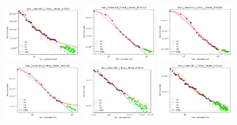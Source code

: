 \documentclass{article} %
\begin{document}
\begin{figure}
    \centering

\includegraphics[width=0.245\textwidth]{figures/scaling_laws_benchmark_dataset_plots__all_functional_forms/caltech_5shot___BiT_50_1.png}
\includegraphics[width=0.245\textwidth]{figures/scaling_laws_benchmark_dataset_plots__all_functional_forms/caltech_5shot___BiT_101_3.png}
\includegraphics[width=0.245\textwidth]{figures/scaling_laws_benchmark_dataset_plots__all_functional_forms/caltech_5shot___MiX_B_16.png}
\includegraphics[width=0.245\textwidth]{figures/scaling_laws_benchmark_dataset_plots__all_functional_forms/caltech_5shot___MiX_L_16.png}
\includegraphics[width=0.245\textwidth]{figures/scaling_laws_benchmark_dataset_plots__all_functional_forms/caltech_5shot___ViT_B_16.png}
\includegraphics[width=0.245\textwidth]{figures/scaling_laws_benchmark_dataset_plots__all_functional_forms/caltech_5shot___ViT_S_16.png}

\end{figure}
\end{document}
